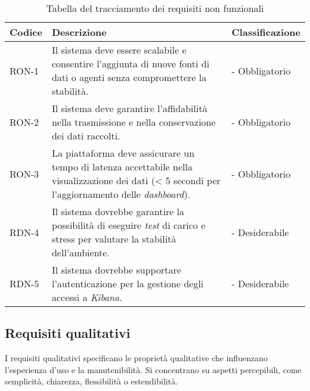 \begin{table}[h]
\caption{Tabella del tracciamento dei requisiti non funzionali}
\label{tab:requisiti-non-funzionali}
\begin{tabularx}{\textwidth}{lXl}
\hline
\rowcolor[gray]{0.8}
\textbf{Codice} & \textbf{Descrizione} & \textbf{Classificazione}\\
\hline
RON-1    & Il sistema deve essere scalabile e consentire l'aggiunta di nuove fonti di dati o agenti senza compromettere la stabilità. & - Obbligatorio \\
\hline

\hline
RON-2    & Il sistema deve garantire l'affidabilità nella trasmissione e nella conservazione dei dati raccolti. & - Obbligatorio \\
\hline

\hline
RON-3    & La piattaforma deve assicurare un tempo di latenza accettabile nella visualizzazione dei dati (< 5 secondi per l'aggiornamento delle \emph{dashboard}). & - Obbligatorio \\
\hline

\hline
RDN-4    & Il sistema dovrebbe garantire la possibilità di eseguire \emph{test} di carico e stress per valutare la stabilità dell'ambiente. & - Desiderabile \\
\hline

\hline
RDN-5    & Il sistema dovrebbe supportare l'autenticazione per la gestione degli accessi a \emph{Kibana}. & - Desiderabile \\
\hline


\end{tabularx}
\end{table}%


\newpage
\subsection{Requisiti qualitativi}
I requisiti qualitativi specificano le proprietà qualitative che influenzano l'esperienza d'uso e la manutenibilità.
Si concentrano su aspetti percepibili, come semplicità, chiarezza, flessibilità o estendibilità.

